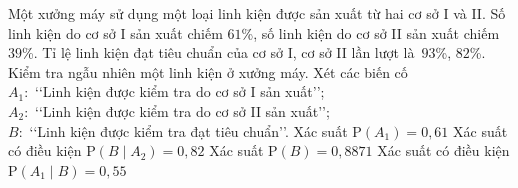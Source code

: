 \begin{ex}%
	Một xưởng máy sử dụng một loại linh kiện được sản xuất từ hai cơ sở I và II. Số linh kiện do cơ sở I sản xuất chiếm $61$\%, số linh kiện do cơ sở II sản xuất chiếm  $39$\%. Tỉ lệ linh kiện đạt tiêu chuẩn của cơ sở I, cơ sở II lần lượt là~$93$\%, $82$\%. Kiểm tra ngẫu nhiên một linh kiện ở xưởng máy. Xét các biến cố\\
	$A_1\colon$ \lq\lq Linh kiện  được kiểm tra do cơ sở I sản xuất\rq\rq;\\
	$A_2\colon$ \lq\lq Linh kiện được kiểm tra do cơ sở II  sản xuất\rq\rq;\\
	$B\colon$ \lq\lq Linh kiện  được kiểm tra đạt tiêu chuẩn\rq\rq .
	\choiceTF 
		 {\True Xác suất $\mathrm{P}\left(A_1 \right)=0{,}61$}
		{\True Xác suất có điều kiện $\mathrm{P}\left(B\mid A_2  \right)=0{,}82$}
		{\True Xác suất  $\mathrm{P}\left(B\right)=0{,}8871$}
		 {Xác suất có điều kiện $\mathrm{P}\left(A_1\mid B\right)=0{,}55$}
\end{ex}

